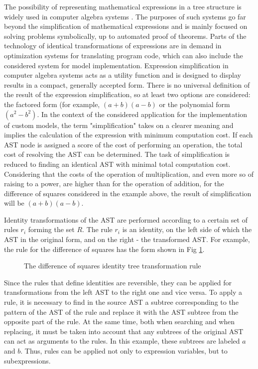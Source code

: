 \documentclass[lettersize,journal]{IEEEtran}
\begin{document}
The possibility of representing mathematical expressions in a tree structure is widely used in computer algebra systems \cite{texbook}. 
The purposes of such systems go far beyond the simplification of mathematical expressions and is mainly focused on solving problems symbolically,
up to automated proof of theorems. Parts of the technology of identical transformations of expressions are in demand in optimization systems for translating program
code, which can also include the considered system for model implementation. Expression simplification in computer algebra systems acts as a utility function 
and is designed to display results in a compact, generally accepted form. There is no universal definition of the result of the expression simplification, so at
least two options are considered: the factored form (for example, \((a+b)(a-b)\) or the polynomial form \((a ^ 2-b ^ 2)\). In the context of 
the considered application for the implementation of custom models, the term "simplification" takes on a clearer meaning and implies the calculation of the
expression with minimum computation cost. If each AST node is assigned a score of the cost of performing an operation, the total cost of resolving the AST 
can be determined. The task of simplification is reduced to finding an identical AST with minimal total computation cost. Considering that the costs of 
the operation of multiplication, and even more so of raising to a power, are higher than for the operation of addition, for the difference of squares 
considered in the example above, the result of simplification will be \((a+b)(a-b)\).

Identity transformations of the AST are performed according to a certain set of rules \(r_i\) forming the set \(R\). The rule \(r_i\) is an identity, 
on the left side of which the AST in the original form, and on the right - the transformed AST. For example, the rule for the difference of squares has the form shown in Fig \ref{fig_simpl}.

\begin{figure}[h]
	\centering
	\caption{The difference of squares identity tree transformation rule}
	\label{fig_simpl}
\end{figure}

Since the rules that define identities are reversible, they can be applied for transformations from the left AST to the right one and vice versa. 
To apply a rule, it is necessary to find in the source AST a subtree corresponding to the pattern of the AST of the rule and replace it
with the AST subtree from the opposite part of the rule. At the same time, both when searching and when replacing, it must be taken into account that any subtrees 
of the original AST can act as arguments to the rules. In this example, these subtrees are labeled \(a\) and \(b\). Thus, rules can be applied not only to 
expression variables, but to subexpressions.
\end{document}
